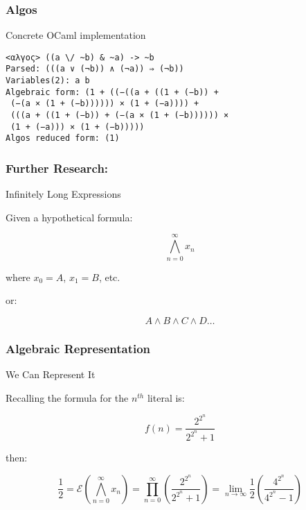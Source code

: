 \documentclass{beamer}
\begin{document}
\begin{frame}[fragile]
\frametitle{Algos}
\begin{block}
{Concrete OCaml implementation}

\begin{center}
\begin{verbatim}
<αλγος> ((a \/ ~b) & ~a) -> ~b
Parsed: (((a ∨ (¬b)) ∧ (¬a)) ⇒ (¬b))
Variables(2): a b
Algebraic form: (1 + ((−((a + ((1 + (−b)) +
 (−(a × (1 + (−b)))))) × (1 + (−a)))) +
 (((a + ((1 + (−b)) + (−(a × (1 + (−b)))))) ×
 (1 + (−a))) × (1 + (−b)))))
Algos reduced form: (1)
\end{verbatim}
\end{center}

\end{block}
\end{frame}

\begin{frame}
\frametitle{Further Research:}
\begin{exampleblock}
{Infinitely Long Expressions}

Given a hypothetical formula:

\[
\bigwedge\limits_{n=0}^\infty x_n
\]

where \(x_0 = A\), \(x_1 = B\), etc.

or:

\[
A \land B \land C \land D \ldots
\]

\end{exampleblock}
\end{frame}

\begin{frame}
\frametitle{Algebraic Representation}
\begin{block}
{We Can Represent It}

Recalling the formula for the \(n^{th}\) literal is:

\[
f(n) = \frac{2^{2^n}}{2^{2^n} + 1}
\]

then:

\[
\frac{1}{2} = \mathcal{E}\left (\bigwedge\limits_{n=0}^\infty x_n \right ) =  \prod_{n=0}^\infty \left ( \frac{2^{2^n}}{2^{2^n} + 1} \right ) = \lim_{n \to \infty}{\frac{1}{2} \left ( \frac{4^{2^n}}{4^{2^n} - 1} \right )}
\]

\end{block}
\end{frame}
\end{document}
